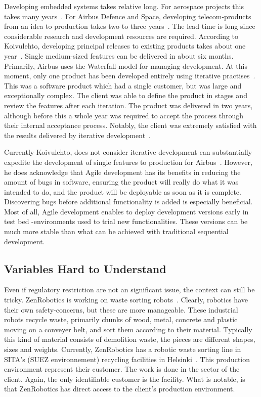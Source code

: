 \documentclass[english]{tktltiki2}
\begin{document}
Developing embedded systems takes relative long. For aerospace projects this takes many years~\cite{Hol15b}. For Airbus Defence and Space, developing telecom-products from an idea to production takes two to three years~\cite{Koi15}. The lead time is long since considerable research and development resources are required. According to Koivulehto, developing principal releases to existing products takes about one year~\cite{Koi15}. Single medium-sized features can be delivered in about six months. Primarily, Airbus uses the Waterfall-model for managing development. At this moment, only one product has been developed entirely using iterative practises~\cite{Koi15}. This was a software product which had a single customer, but was large and exceptionally complex. The client was able to define the product in stages and review the features after each iteration. The product was delivered in two years, although before this a whole year was required to accept the process through their internal acceptance process. Notably, the client was extremely satisfied with the results delivered by iterative development~\cite{Koi15}.

Currently Koivulehto, does not consider iterative development can substantially expedite the development of single features to production for Airbus~\cite{Koi15}. However, he does acknowledge that Agile development has its benefits in reducing the amount of bugs in software, ensuring the product will really do what it was intended to do, and the product will be deployable as soon as it is complete. Discovering bugs before additional functionality is added is especially beneficial. Most of all, Agile development enables to deploy development versions early in test bed -environments used to trial new functionalities. These versions can be much more stable than what can be achieved with traditional sequential development.

\subsection{Variables Hard to Understand}

Even if regulatory restriction are not an significant issue, the context can still be tricky. ZenRobotics is working on waste sorting robots~\cite{Hol15a}. Clearly, robotics have their own safety-concerns, but these are more manageable. These industrial robots recycle waste, primarily chunks of wood, metal, concrete and plastic moving on a conveyer belt, and sort them according to their material. Typically this kind of material consists of demolition waste, the pieces are different shapes, sizes and weights. Currently, ZenRobotics has a robotic waste sorting line in SITA’s (SUEZ environnement) recycling facilities in Helsinki~\cite{Hol15a, SITA}. This production environment represent their customer. The work is done in the sector of the client. Again, the only identifiable customer is the facility. What is notable, is that ZenRobotics has direct access to the client’s production environment.
\end{document}
